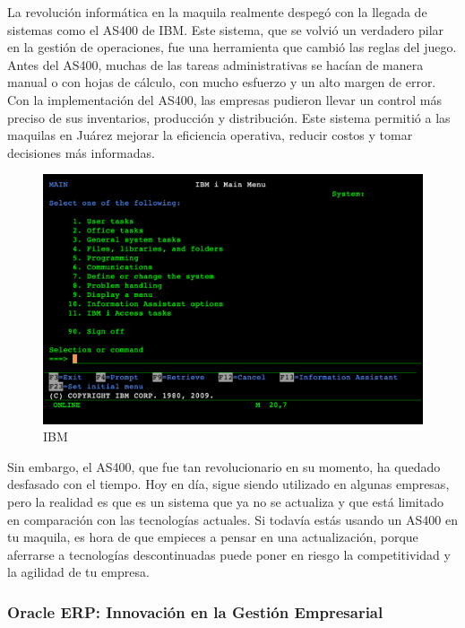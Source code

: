 \documentclass[
  10pt,
  letterpaper,
]{book}
\begin{document}
La revolución informática en la maquila realmente despegó con la llegada
de sistemas como el AS400 de IBM. Este sistema, que se volvió un
verdadero pilar en la gestión de operaciones, fue una herramienta que
cambió las reglas del juego. Antes del AS400, muchas de las tareas
administrativas se hacían de manera manual o con hojas de cálculo, con
mucho esfuerzo y un alto margen de error. Con la implementación del
AS400, las empresas pudieron llevar un control más preciso de sus
inventarios, producción y distribución. Este sistema permitió a las
maquilas en Juárez mejorar la eficiencia operativa, reducir costos y
tomar decisiones más informadas.

\begin{figure}[H]

{\centering \includegraphics{Img/ibm.png}

}

\caption{IBM}

\end{figure}%

Sin embargo, el AS400, que fue tan revolucionario en su momento, ha
quedado desfasado con el tiempo. Hoy en día, sigue siendo utilizado en
algunas empresas, pero la realidad es que es un sistema que ya no se
actualiza y que está limitado en comparación con las tecnologías
actuales. Si todavía estás usando un AS400 en tu maquila, es hora de que
empieces a pensar en una actualización, porque aferrarse a tecnologías
descontinuadas puede poner en riesgo la competitividad y la agilidad de
tu empresa.

\subsubsection{Oracle ERP: Innovación en la Gestión
Empresarial}\label{oracle-erp-innovaciuxf3n-en-la-gestiuxf3n-empresarial}
\end{document}
